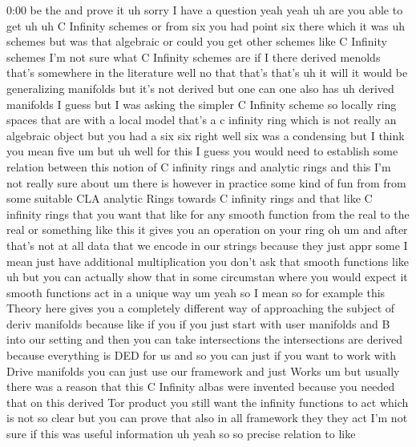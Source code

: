 \begin{unfinished}{0:00}
be  the  and  prove  it  uh  sorry  I  have  a
question  yeah  yeah  uh  are  you  able  to
get  uh  uh  C  Infinity  schemes  or  from  six
you  had  point  six  there  which  it  was  uh
schemes  but  was  that  algebraic  or  could
you  get  other  schemes  like  C  Infinity
schemes  I'm  not  sure  what  C  Infinity
schemes  are  if  I  there  derived  menolds
that's  somewhere  in  the  literature  well
no  that  that's  that's
uh  it  will  it  would  be  generalizing
manifolds  but  it's  not
derived  but  one  can  one  also  has  uh
derived  manifolds  I  guess  but  I  was
asking  the  simpler  C  Infinity  scheme  so
locally  ring  spaces  that  are  with  a
local  model  that's  a  c  infinity  ring
which  is  not  really  an  algebraic  object
but  you  had  a
six  six  right  well  six  was  a  condensing
but  I  think  you  mean  five  um
but
uh  well  for  this  I  guess  you  would  need
to  establish  some  relation  between  this
notion  of  C  infinity  rings  and  analytic
rings  and  this  I'm  not  really  sure
about
um  there  is  however  in  practice  some
kind  of  fun  from  from  some  suitable  CLA
analytic  Rings  towards  C  infinity  rings
and  that  like  C  infinity  rings  that  you
want  that  like  for  any  smooth  function
from  the  real  to  the  real  or  something
like  this  it  gives  you  an  operation  on
your
ring  oh  um  and  after  that's  not  at  all
data  that  we  encode  in  our  strings
because  they  just  appr  some  I  mean  just
have  additional  multiplication  you  don't
ask  that  smooth  functions  like  uh  but
you  can  actually  show  that  in  some
circumstan  where  you  would  expect  it
smooth  functions  act  in  a  unique  way
um  yeah  so  I  mean  so  for  example  this
Theory  here  gives  you  a  completely
different  way  of  approaching  the  subject
of  deriv  manifolds
because  like  if  you  if  you  just  start
with  user  manifolds  and  B  into  our
setting  and  then  you  can  take
intersections  the  intersections  are
derived  because  everything  is  DED  for  us
and  so  you  can  just  if  you  want  to  work
with  Drive  manifolds  you  can  just  use
our  framework  and  just  Works  um  but
usually  there  was  a  reason  that  this  C
Infinity  albas  were  invented  because  you
needed  that  on  this
derived  Tor  product  you  still  want  the
infinity  functions  to  act  which  is  not
so  clear  but  you  can  prove  that  also  in
all  framework  they  they
act  I'm  not  sure  if  this  was  useful
information
uh  yeah  so  so  precise  relation  to  like

\end{unfinished}
